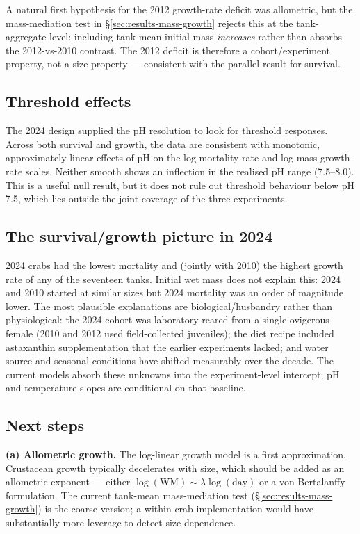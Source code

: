 \documentclass[11pt]{article}
\begin{document}
A natural first hypothesis for the 2012 growth-rate deficit was allometric, but the mass-mediation test in §\ref{sec:results-mass-growth} rejects this at the tank-aggregate level: including tank-mean initial mass \textit{increases} rather than absorbs the 2012-vs-2010 contrast. The 2012 deficit is therefore a cohort/experiment property, not a size property --- consistent with the parallel result for survival.

\subsection{Threshold effects}
The 2024 design supplied the pH resolution to look for threshold responses. Across both survival and growth, the data are consistent with monotonic, approximately linear effects of pH on the log mortality-rate and log-mass growth-rate scales. Neither smooth shows an inflection in the realised pH range (7.5--8.0). This is a useful null result, but it does not rule out threshold behaviour below pH 7.5, which lies outside the joint coverage of the three experiments.

\subsection{The survival/growth picture in 2024}
2024 crabs had the lowest mortality and (jointly with 2010) the highest growth rate of any of the seventeen tanks. Initial wet mass does not explain this: 2024 and 2010 started at similar sizes but 2024 mortality was an order of magnitude lower. The most plausible explanations are biological/husbandry rather than physiological: the 2024 cohort was laboratory-reared from a single ovigerous female (2010 and 2012 used field-collected juveniles); the diet recipe included astaxanthin supplementation that the earlier experiments lacked; and water source and seasonal conditions have shifted measurably over the decade. The current models absorb these unknowns into the experiment-level intercept; pH and temperature slopes are conditional on that baseline.

\subsection{Next steps}
\label{sec:nextsteps}
\noindent\textbf{(a) Allometric growth.} The log-linear growth model is a first approximation. Crustacean growth typically decelerates with size, which should be added as an allometric exponent --- either $\log(\text{WM}) \sim \lambda \log(\text{day})$ or a von Bertalanffy formulation. The current tank-mean mass-mediation test (§\ref{sec:results-mass-growth}) is the coarse version; a within-crab implementation would have substantially more leverage to detect size-dependence.
\end{document}
